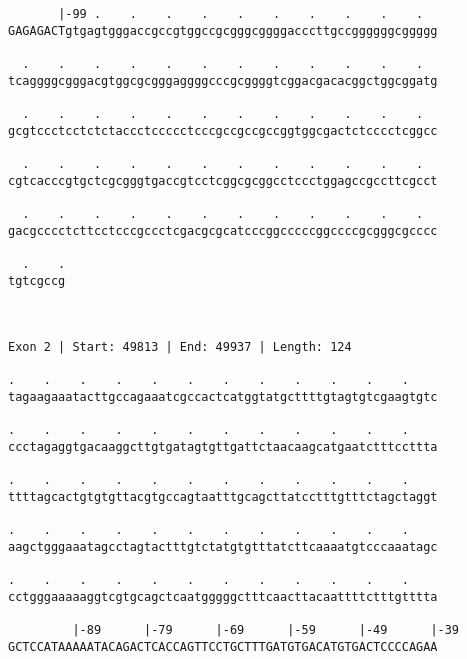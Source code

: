 \documentclass{article}
\begin{document}
\begin{Verbatim}
       |-99 .    .    .    .    .    .    .    .    .    .  
GAGAGACTgtgagtgggaccgccgtggccgcgggcggggacccttgccggggggcggggg
                                                            
  .    .    .    .    .    .    .    .    .    .    .    .  
tcaggggcgggacgtggcgcgggaggggcccgcggggtcggacgacacggctggcggatg
                                                            
  .    .    .    .    .    .    .    .    .    .    .    .  
gcgtccctcctctctaccctccccctcccgccgccgccggtggcgactctcccctcggcc
                                                            
  .    .    .    .    .    .    .    .    .    .    .    .  
cgtcacccgtgctcgcgggtgaccgtcctcggcgcggcctccctggagccgccttcgcct
                                                            
  .    .    .    .    .    .    .    .    .    .    .    .  
gacgcccctcttcctcccgccctcgacgcgcatcccggcccccggccccgcgggcgcccc
                                                            
  .    .
tgtcgccg
        
        
 
Exon 2 | Start: 49813 | End: 49937 | Length: 124
 
.    .    .    .    .    .    .    .    .    .    .    .    
tagaagaaatacttgccagaaatcgccactcatggtatgcttttgtagtgtcgaagtgtc
                                                            
.    .    .    .    .    .    .    .    .    .    .    .    
ccctagaggtgacaaggcttgtgatagtgttgattctaacaagcatgaatctttccttta
                                                            
.    .    .    .    .    .    .    .    .    .    .    .    
ttttagcactgtgtgttacgtgccagtaatttgcagcttatcctttgtttctagctaggt
                                                            
.    .    .    .    .    .    .    .    .    .    .    .    
aagctgggaaatagcctagtactttgtctatgtgtttatcttcaaaatgtcccaaatagc
                                                            
.    .    .    .    .    .    .    .    .    .    .    .    
cctgggaaaaaggtcgtgcagctcaatgggggctttcaacttacaattttctttgtttta
                                                            
         |-89      |-79      |-69      |-59      |-49      |-39
GCTCCATAAAAATACAGACTCACCAGTTCCTGCTTTGATGTGACATGTGACTCCCCAGAA
                                                            

\end{Verbatim}
\end{document}
